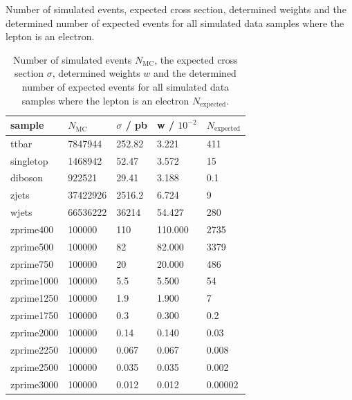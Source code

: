 \begin{table}[H]
  \centering
  \caption{Number of simulated events, expected cross section, determined weights and the determined number of expected events for all simulated
data samples where the lepton is an electron.}
  \begin{tabular}{l|llll}
      sample           &  $N_\text{MC}$  & $\sigma$ / pb & w / $10^{-2}$& $N_\text{expected}$ \\
      \hline
      ttbar      & 7847944    & 252.82    &    3.221   &     411       \\
      singletop  & 1468942    & 52.47     &    3.572   &     15       \\
      diboson    & 922521     & 29.41     &    3.188   &         0.1       \\
      zjets      & 37422926   & 2516.2    &    6.724   &     9       \\
      wjets      & 66536222   & 36214     &   54.427   &     280       \\
      zprime400  & 100000     & 110       &  110.000   &     2735       \\
      zprime500  & 100000     & 82        &   82.000   &     3379       \\
      zprime750  & 100000     & 20        &   20.000   &     486       \\
      zprime1000 & 100000     & 5.5       &    5.500   &     54       \\
      zprime1250 & 100000     & 1.9       &    1.900   &     7       \\
      zprime1750 & 100000     & 0.3       &    0.300   &     0.2       \\
      zprime2000 & 100000     & 0.14      &    0.140   &     0.03       \\
      zprime2250 & 100000     & 0.067     &    0.067   &     0.008       \\
      zprime2500 & 100000     & 0.035     &    0.035   &     0.002       \\
      zprime3000 & 100000     & 0.012     &    0.012   &     0.00002       \\
      \end{tabular}
\caption{Number of simulated events $N_\text{MC}$, the expected cross section $\sigma$, determined weights $w$ and the determined number of 
expected events for all simulated
data samples where the lepton is an electron $N_\text{expected}$.}
\label{tab:agree}

  \end{table}

